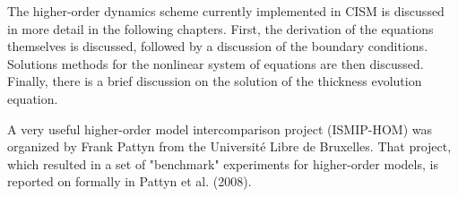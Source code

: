 The higher-order dynamics scheme currently implemented in CISM is discussed in more detail in the following chapters. First, the derivation of the equations themselves is discussed, followed by a discussion of the boundary conditions. Solutions methods for the nonlinear system of equations are then discussed. Finally, there is a brief discussion on the solution of the thickness evolution equation. 

A very useful higher-order model intercomparison project (ISMIP-HOM) was organized by Frank Pattyn from the Université Libre de Bruxelles. That project, which resulted in a set of "benchmark" experiments for higher-order models, is reported on formally in Pattyn et al. (2008). 

%